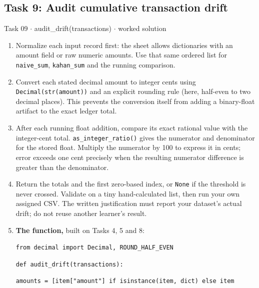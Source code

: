 \documentclass[11pt]{article}
\begin{document}
\begin{keepsection}\subsection{Task 9: Audit cumulative transaction drift}

\begin{workedbox}{Task 09 \ensuremath{\cdot} audit\_drift(transactions) \ensuremath{\cdot} worked solution}
\begin{enumerate}
\item Normalize each input record first: the sheet allows dictionaries with an amount field or raw numeric amounts. Use that same ordered list for \texttt{naive\_sum}, \texttt{kahan\_sum} and the running comparison.
\item Convert each stated decimal amount to integer cents using \texttt{Decimal(\texttt{str(amount)})} and an explicit rounding rule (here, half-even to two decimal places). This prevents the conversion itself from adding a binary-float artifact to the exact ledger total.
\item After each running float addition, compare its exact rational value with the integer-cent total. \texttt{as\_integer\_ratio()} gives the numerator and denominator for the stored float. Multiply the numerator by 100 to express it in cents; error exceeds one cent precisely when the resulting numerator difference is greater than the denominator.
\item Return the totals and the first zero-based index, or \texttt{None} if the threshold is never crossed. Validate on a tiny hand-calculated list, then run your own assigned CSV. The written justification must report your dataset’s actual drift; do not reuse another learner’s result.
\item {}
\textbf{The function,} built on Tasks 4, 5 and 8:
\begin{tcolorbox}[colback=Paperblue,colframe=Paperblue,boxrule=0pt,arc=0pt,left=7pt,right=7pt,top=5pt,bottom=5pt]\small\sloppy
\noindent\hspace*{0em}\texttt{from decimal import Decimal, ROUND\_HALF\_EVEN}\par
\noindent\hspace*{0em}\texttt{}\par
\noindent\hspace*{0em}\texttt{def audit\_drift(transactions):}\par
\noindent\hspace*{1em}\texttt{amounts = [item["amount"] if isinstance(item, dict) else item}\par

\end{tcolorbox}
\end{enumerate}
\end{workedbox}
\end{keepsection}
\end{document}
